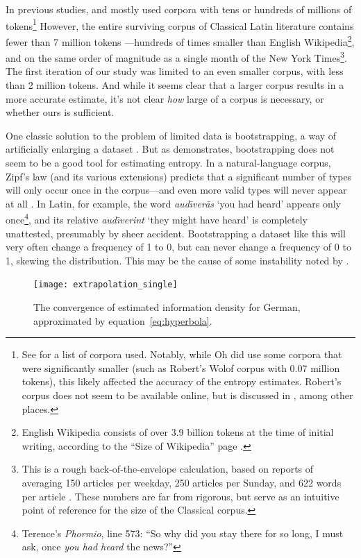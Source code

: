 \documentclass[12pt,twoside]{article}
\begin{document}
In previous studies, \citet{coupé} and \citet{oh} mostly used corpora with tens or hundreds of millions of tokens\footnote{See \cite[30-31]{oh} for a list of corpora used. Notably, while Oh did use some corpora that were significantly smaller (such as Robert's Wolof corpus with 0.07 million tokens), this likely affected the accuracy of the entropy estimates. Robert's corpus does not seem to be available online, but is discussed in \citet{robert}, among other places.} However, the entire surviving corpus of Classical Latin literature contains fewer than 7 million tokens \citep{phi}---hundreds of times smaller than English Wikipedia\footnote{English Wikipedia consists of over 3.9 billion tokens at the time of initial writing, according to the ``Size of Wikipedia'' page \citep{wiki}.}, and on the same order of magnitude as a single month of the New York Times\footnote{This is a rough back-of-the-envelope calculation, based on reports of averaging 150 articles per weekday, 250 articles per Sunday, and 622 words per article \citep{meyer,menendez}. These numbers are far from rigorous, but serve as an intuitive point of reference for the size of the Classical corpus.}. The first iteration of our study was limited to an even smaller corpus, with less than 2 million tokens. And while it seems clear that a larger corpus results in a more accurate estimate, it's not clear \emph{how} large of a corpus is necessary, or whether ours is sufficient.

One classic solution to the problem of limited data is bootstrapping, a way of artificially enlarging a dataset \citep{oh,efron}. But as \citet[55-56]{oh} demonstrates, bootstrapping does not seem to be a good tool for estimating entropy. In a natural-language corpus, Zipf's law (and its various extensions) predicts that a significant number of types will only occur once in the corpus---and even more valid types will never appear at all \citep{davis}. In Latin, for example, the word \emph{aud\=\i{}ver\=as} `you had heard' appears only once\footnote{Terence's \emph{Phormio}, line 573: ``So why did you stay there for so long, I must ask, once \emph{you had heard} the news?''}, and its relative \emph{aud\=\i{}verint} `they might have heard' is completely unattested, presumably by sheer accident. Bootstrapping a dataset like this will very often change a frequency of 1 to 0, but can never change a frequency of 0 to 1, skewing the distribution. This may be the cause of some instability noted by \citet[56]{oh}.

\begin{figure}[p]
\centering
\caption{The convergence of estimated information density for German, approximated by equation~\ref{eq:hyperbola}.}
\label{fig:exsingle}
\noindent\texttt{[image: extrapolation\_single]}
\end{figure}
\end{document}
